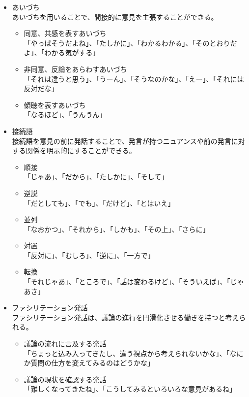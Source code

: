 \documentclass[11pt, a4paper]{jreport} %
\begin{document}
\begin{itemize}
\item あいづち\\
あいづちを用いることで、間接的に意見を主張することができる。
\begin{itemize}
\item 同意、共感を表すあいづち\\
「やっぱそうだよね」、「たしかに」、「わかるわかる」、「そのとおりだよ」、「わかる気がする」
\item 非同意、反論をあらわすあいづち\\
「それは違うと思う」、「うーん」、「そうなのかな」、「えー」、「それには反対だな」
\item 傾聴を表すあいづち\\
「なるほど」、「うんうん」

\end{itemize}

\item 接続語\\
接続語を意見の前に発話することで、発言が持つニュアンスや前の発言に対する関係を明示的にすることができる。
\begin{itemize}
\item 順接\\
「じゃあ」、「だから」、「たしかに」、「そして」
\item 逆説\\
「だとしても」、「でも」、「だけど」、「とはいえ」
\item 並列\\
「なおかつ」、「それから」、「しかも」、「その上」、「さらに」
\item 対置\\
「反対に」、「むしろ」、「逆に」、「一方で」
\item 転換\\
「それじゃあ」、「ところで」、「話は変わるけど」、「そういえば」、「じゃあさ」
\end{itemize}

\item ファシリテーション発話\\
ファシリテーション発話は、議論の進行を円滑化させる働きを持つと考えられる。
\begin{itemize}
\item 議論の流れに言及する発話\\
「ちょっと込み入ってきたし、違う視点から考えられないかな」、「なにか質問の仕方を変えてみるのはどうかな」
\item 議論の現状を確認する発話\\
「難しくなってきたね」、「こうしてみるといろいろな意見があるね」
\end{itemize}

\end{itemize}
\end{document}
